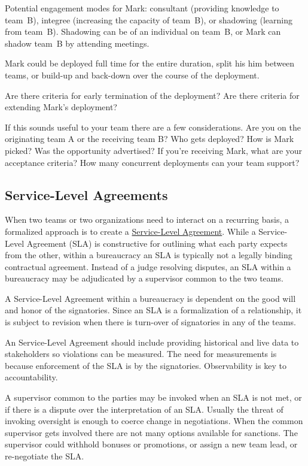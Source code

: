 Potential engagement modes for Mark: consultant (providing knowledge to team~B), integree (increasing the capacity of team~B), or shadowing (learning from team~B). Shadowing can be of an individual on team~B, or Mark can shadow team~B by attending meetings. 


Mark could be deployed full time for the entire duration, split his him between teams, or build-up and back-down over the course of the deployment.

Are there criteria for early termination of the deployment? Are there criteria for extending Mark's deployment?

If this sounds useful to your team there are a few considerations. Are you on the originating team A or the receiving team B? Who gets deployed? How is Mark picked? Was the opportunity advertised? If you're receiving Mark, what are your acceptance criteria? How many concurrent deployments can your team support?


\subsection*{Service-Level Agreements\label{sec:sla}}

When two teams or two organizations need to interact on a recurring basis, a formalized approach is to create a \href{https://en.wikipedia.org/wiki/Service-level_agreement}{Service-Level Agreement}. 
While a Service-Level Agreement (SLA) is constructive for outlining what each party expects from the other, within a bureaucracy an SLA is typically not a legally binding contractual agreement. Instead of a judge resolving disputes, an SLA within a bureaucracy may be adjudicated by a supervisor common to the two teams.

A Service-Level Agreement within a bureaucracy is dependent on the good will and honor of the signatories. Since an SLA is a formalization of a relationship, it is subject to revision when there is turn-over of signatories in any of the teams. 

An Service-Level Agreement should include providing historical and live data to stakeholders so violations can be measured. The need for measurements is because enforcement of the SLA is by the signatories. Observability is key to accountability. 

A supervisor common to the parties may be invoked when an SLA is not met, or if there is a dispute over the interpretation of an SLA. Usually the threat of invoking oversight is enough to coerce change in negotiations. 
When the common supervisor gets involved there are not many options available for sanctions. The supervisor could withhold bonuses or promotions, or assign a new team lead, or re-negotiate the SLA. 


